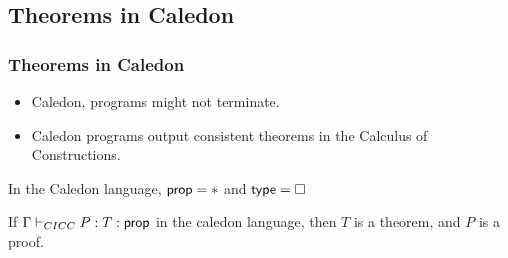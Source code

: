 \subsection{Theorems in Caledon}
\begin{frame}
\frametitle{Theorems in Caledon}

\begin{itemize}
\item Caledon, programs might not terminate. 
\item Caledon programs output consistent theorems in the Calculus of Constructions.
\end{itemize}

\begin{definition}
In the Caledon language, $\mathsf{prop} = *$ and $\mathsf{type} = \Box$
\end{definition}

\begin{definition}
If $\Gamma \vdash_{CICC} P : T : \mathsf{prop}$ in the caledon language, then $T$ is a theorem, and $P$ is a proof.
\end{definition}

\end{frame}
